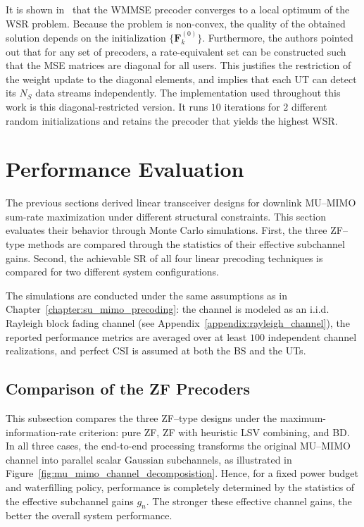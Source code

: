 It is shown in~\cite{WMMSE_precoding} that the \ac{WMMSE} precoder converges to a local optimum of the \ac{WSR} problem.
Because the problem is non-convex, the quality of the obtained solution depends on the initialization $\{\mathbf{F}_k^{(0)}\}$.
Furthermore, the authors pointed out that for any set of precoders, a rate-equivalent set can be constructed such that the MSE matrices are diagonal for all users.
This justifies the restriction of the weight update to the diagonal elements, and implies that each \ac{UT} can detect its $N_S$ data streams independently.
The implementation used throughout this work is this diagonal-restricted version. It runs $10$ iterations for $2$ different random initializations and retains the precoder that yields the highest \ac{WSR}.

\section{Performance Evaluation}
\label{section:mu_mimo_performance_evaluation}

The previous sections derived linear transceiver designs for downlink \ac{MU}--\ac{MIMO} sum-rate maximization under different structural constraints.
This section evaluates their behavior through Monte Carlo simulations.
First, the three \ac{ZF}--type methods are compared through the statistics of their effective subchannel gains.
Second, the achievable \ac{SR} of all four linear precoding techniques is compared for two different system configurations.

The simulations are conducted under the same assumptions as in Chapter~\ref{chapter:su_mimo_precoding}: 
the channel is modeled as an \ac{i.i.d.} Rayleigh block fading channel (see Appendix~\ref{appendix:rayleigh_channel}), the reported performance metrics are averaged over at least $100$ independent channel realizations, and perfect \ac{CSI} is assumed at both the \ac{BS} and the \acp{UT}.

\subsection{Comparison of the ZF Precoders}
\label{section:mu_mimo_comparison_zf_precoders}

This subsection compares the three \ac{ZF}--type designs under the maximum-information-rate criterion: pure \ac{ZF}, \ac{ZF} with heuristic \ac{LSV} combining, and \ac{BD}.
In all three cases, the end-to-end processing transforms the original \ac{MU}--\ac{MIMO} channel into parallel scalar Gaussian subchannels, as illustrated in Figure~\ref{fig:mu_mimo_channel_decomposistion}.
Hence, for a fixed power budget and waterfilling policy, performance is completely determined by the statistics of the effective subchannel gains $g_n$.
The stronger these effective channel gains, the better the overall system performance.

